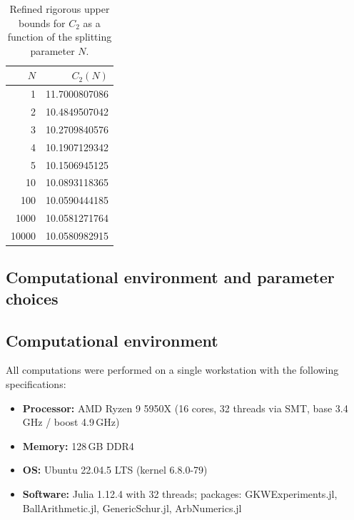 \documentclass[11pt]{article}
\begin{document}
\begin{table}[htbp]
\centering
\begin{tabular}{r r}
\hline
$N$ & $C_2(N)$ \\ \hline
1 & 11.7000807086 \\
2 & 10.4849507042 \\
3 & 10.2709840576 \\
4 & 10.1907129342 \\
5 & 10.1506945125 \\
10 & 10.0893118365 \\
100 & 10.0590444185 \\
1000 & 10.0581271764 \\
10000 & 10.0580982915 \\
\hline
\end{tabular}
\caption{Refined rigorous upper bounds for $C_2$ as a function of the splitting parameter $N$.}
\label{tab:C2-bounds}
\end{table}

\subsection{Computational environment and parameter choices}
\label{subsec:gkw-env-params}

\subsection*{Computational environment}

All computations were performed on a single workstation with the following specifications:
\begin{itemize}
\item \textbf{Processor:} AMD Ryzen 9 5950X (16 cores, 32 threads via SMT, base 3.4\,GHz / boost 4.9\,GHz)
\item \textbf{Memory:} 128\,GB DDR4
\item \textbf{OS:} Ubuntu 22.04.5 LTS (kernel 6.8.0-79)
\item \textbf{Software:} Julia 1.12.4 with 32 threads; packages: GKWExperiments.jl, BallArithmetic.jl, GenericSchur.jl, ArbNumerics.jl
\end{itemize}
\end{document}

